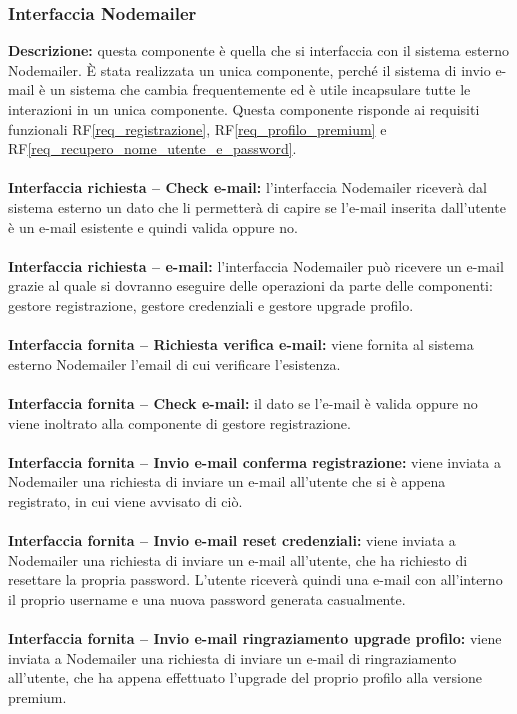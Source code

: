 \subsubsection{Interfaccia Nodemailer}
\textbf{Descrizione:} questa componente è quella che si interfaccia con il sistema esterno Nodemailer. È stata realizzata un unica componente, perché il sistema di invio e-mail è un sistema che cambia frequentemente ed è utile incapsulare tutte le interazioni in un unica componente. Questa componente risponde ai requisiti funzionali RF\ref{req_registrazione}, RF\ref{req_profilo_premium} e RF\ref{req_recupero_nome_utente_e_password}. \\
\\
\textbf{Interfaccia richiesta – Check e-mail:} l'interfaccia Nodemailer riceverà dal sistema esterno un dato che li permetterà di capire se l'e-mail inserita dall'utente è un e-mail esistente e quindi valida oppure no. \\
\\
\textbf{Interfaccia richiesta – e-mail:} l'interfaccia Nodemailer può ricevere un e-mail grazie al quale si dovranno eseguire delle operazioni da parte delle componenti: gestore registrazione, gestore credenziali e gestore upgrade profilo. \\
\\
\textbf{Interfaccia fornita – Richiesta verifica e-mail:} viene fornita al sistema esterno Nodemailer l'email di cui verificare l'esistenza. \\
\\
\textbf{Interfaccia fornita – Check e-mail:} il dato se l'e-mail è valida oppure no viene inoltrato alla componente di gestore registrazione. \\
\\
\textbf{Interfaccia fornita – Invio e-mail conferma registrazione:} viene inviata a Nodemailer una richiesta di inviare un e-mail all'utente che si è appena registrato, in cui viene avvisato di ciò. \\
\\
\textbf{Interfaccia fornita – Invio e-mail reset credenziali:} viene inviata a Nodemailer una richiesta di inviare un e-mail all'utente, che ha richiesto di resettare la propria password. L'utente riceverà quindi una e-mail con all'interno il proprio username e una nuova password generata casualmente. \\
\\
\textbf{Interfaccia fornita – Invio e-mail ringraziamento upgrade profilo:} viene inviata a Nodemailer una richiesta di inviare un e-mail di ringraziamento all'utente, che ha appena effettuato l'upgrade del proprio profilo alla versione premium. \\
\\

